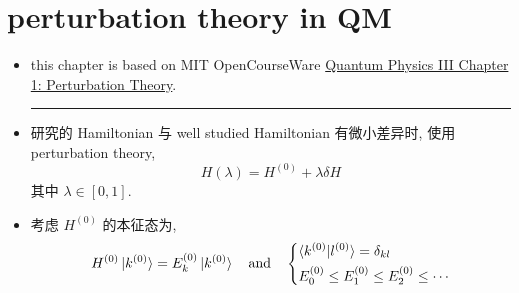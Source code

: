 \chapter{perturbation theory in QM} \label{C}
\begin{itemize}
	\item this chapter is based on MIT OpenCourseWare \href{https://ocw.mit.edu/courses/8-06-quantum-physics-iii-spring-2018/resources/mit8_06s18ch1/}{Quantum Physics III Chapter 1: Perturbation Theory}.
	
	\noindent\rule[0.5ex]{\linewidth}{0.5pt} %
	
	\item 研究的 Hamiltonian 与 well studied Hamiltonian 有微小差异时, 使用 perturbation theory,
	\begin{equation}
		H(\lambda) = H^{(0)} + \lambda \delta H
	\end{equation}
	其中 $\lambda \in [0, 1]$.
	
	\item 考虑 $H^{(0)}$ 的本征态为,
	\begin{equation}
		H^{(0)} \ket{k^{(0)}} = E_k^{(0)} \ket{k^{(0)}} \quad \text{and} \quad \begin{dcases}
			\braket{k^{(0)} | l^{(0)}} = \delta_{k l} \\
			E_0^{(0)} \leq E_1^{(0)} \leq E_2^{(0)} \leq \cdots
		\end{dcases}
	\end{equation}
\end{itemize}

